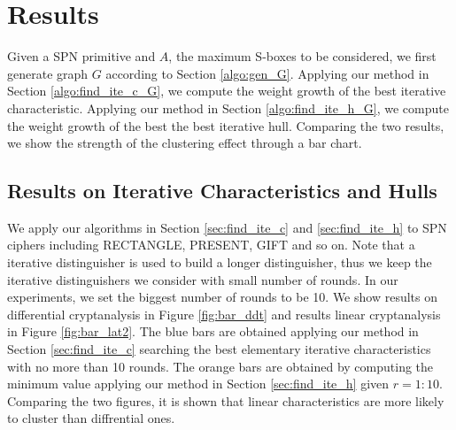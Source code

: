 \section{Results}

Given a SPN primitive and $A$, the maximum S-boxes to be considered, we first generate graph $G$ according to Section \ref{algo:gen_G}. Applying our method in Section \ref{algo:find_ite_c_G}, we compute the weight growth of the best iterative characteristic. Applying our method in Section \ref{algo:find_ite_h_G}, we compute the weight growth of the best the best iterative hull. Comparing the two results, we show the strength of the clustering effect through a bar chart. 

\subsection{Results on Iterative Characteristics and Hulls}

We apply our algorithms in Section \ref{sec:find_ite_c} and \ref{sec:find_ite_h} to SPN ciphers including RECTANGLE, PRESENT, GIFT and so on. Note that a iterative distinguisher is used to build a longer distinguisher, thus we keep the iterative distinguishers we consider with small number of rounds. In our experiments, we set the biggest number of rounds to be 10. We show results on differential cryptanalysis in Figure \ref{fig:bar_ddt} and results linear cryptanalysis in Figure \ref{fig:bar_lat2}. The blue bars are obtained applying our method in Section \ref{sec:find_ite_c} searching the best elementary iterative characteristics with no more than 10 rounds. The orange bars are obtained by computing the minimum value applying our method in Section \ref{sec:find_ite_h} given $r=1:10$. Comparing the two figures, it is shown that linear characteristics are more likely to cluster than diffrential ones. 

